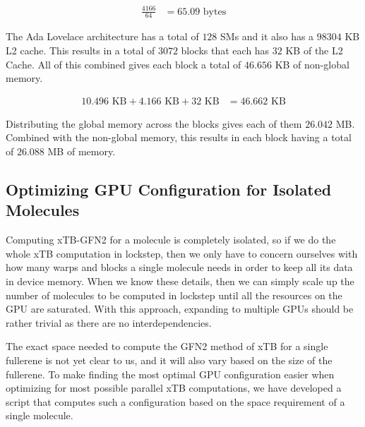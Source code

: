 \begin{equation}
\begin{split}
  \frac{4166}{64} &= 65.09 \text{ bytes}
\end{split}
\end{equation}

The Ada Lovelace architecture has a total of $128$ SMs and it also has a $98304$ KB L2 cache. This results in a total of $3072$ blocks that each has $32$ KB of the L2 Cache. All of this combined gives each block a total of $46.656$ KB of non-global memory.

\begin{equation}
\begin{split}
  10.496 \text{ KB} + 4.166 \text{ KB} + 32 \text{ KB} &= 46.662 \text{ KB}
\end{split}
\end{equation}

Distributing the global memory across the blocks gives each of them $26.042$ MB. Combined with the non-global memory, this results in each block having a total of $26.088$ MB of memory.

\subsection{Optimizing GPU Configuration for Isolated Molecules}

Computing xTB-GFN2 for a molecule is completely isolated, so if we do the whole xTB computation in lockstep, then we only have to concern ourselves with how many warps and blocks a single molecule needs in order to keep all its data in device memory. When we know these details, then we can simply scale up the number of molecules to be computed in lockstep until all the resources on the GPU are saturated. With this approach, expanding to multiple GPUs should be rather trivial as there are no interdependencies.

The exact space needed to compute the GFN2 method of xTB for a single fullerene is not yet clear to us, and it will also vary based on the size of the fullerene. To make finding the most optimal GPU configuration easier when optimizing for most possible parallel xTB computations, we have developed a script that computes such a configuration based on the space requirement of a single molecule.

